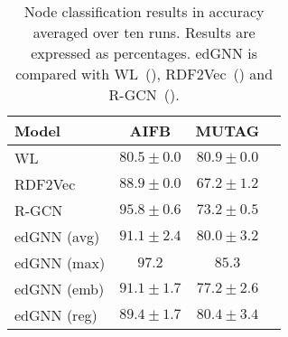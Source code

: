 \documentclass{article} \usepackage{iclr2019_conference,times}
\begin{document}
\begin{table}[h]
  \caption{Node classification results in accuracy averaged over ten runs. Results are expressed as percentages. edGNN is compared with WL~(\cite{DeVries2015}), RDF2Vec~(\cite{Ristoski2016a}) and R-GCN~(\cite{Schlichtkrull2018}).}
  \label{tab:node_class}
  \centering
  \begin{tabular}{lccc}
  \toprule
    Model & AIFB & MUTAG \\
    \midrule
    WL          & $80.5 \pm 0.0$          & $\mathbf{80.9 \pm 0.0}$  \\
    RDF2Vec     & $88.9 \pm 0.0$          & $67.2\pm 1.2$            \\
    R-GCN       & $\mathbf{95.8 \pm 0.6}$ & $73.2 \pm 0.5$           \\
    edGNN (avg) & $91.1 \pm 2.4$          & $80.0 \pm 3.2$           \\
    edGNN (max) & $\mathbf{97.2}$         & $\mathbf{85.3}$          \\
    \midrule
    edGNN (emb) & $91.1 \pm 1.7$          & $77.2 \pm 2.6$           \\
    edGNN (reg) & $89.4 \pm 1.7$          & $80.4 \pm 3.4$           \\
    \bottomrule
  \end{tabular}
\end{table}
\end{document}
